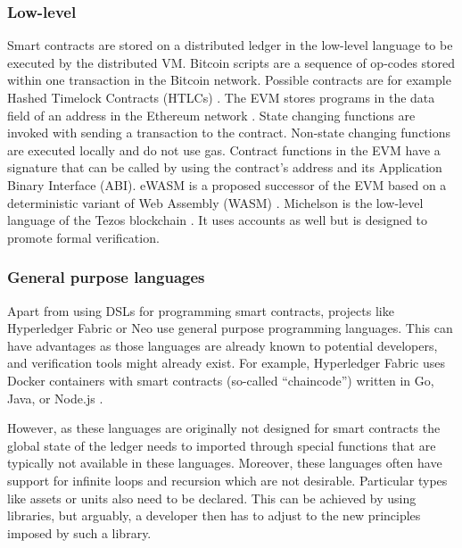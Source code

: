 \subsubsection{Low-level}
Smart contracts are stored on a distributed ledger in the low-level language to be executed by the distributed VM.
Bitcoin scripts are a sequence of op-codes stored within one transaction in the Bitcoin network\cite{BitcoinWiki2018Script}. 
Possible contracts are for example Hashed Timelock Contracts (HTLCs) \cite{BitcoinWiki2018HTLC}.
The EVM stores programs in the data field of an address in the Ethereum network \cite{Wood2014}. State changing functions are invoked with sending a transaction to the contract. Non-state changing functions are executed locally and do not use gas. Contract functions in the EVM have a signature that can be called by using the contract's address and its Application Binary Interface (ABI).
eWASM is a proposed successor of the EVM based on a deterministic variant of Web Assembly (WASM) \cite{Wanderer2015,EthereumFoundation2018ewasm}.
Michelson is the low-level language of the Tezos blockchain \cite{DynamicLedgerSolutions2017}. It uses accounts as well but is designed to promote formal verification.

\subsubsection{General purpose languages}
Apart from using DSLs for programming smart contracts, projects like Hyperledger Fabric or Neo use general purpose programming languages.
This can have advantages as those languages are already known to potential developers, and verification tools might already exist.
For example, Hyperledger Fabric uses Docker containers with smart contracts (so-called ``chaincode'') written in Go, Java, or Node.js \cite{Cachin2016}. 

However, as these languages are originally not designed for smart contracts the global state of the ledger needs to imported through special functions that are typically not available in these languages.
Moreover, these languages often have support for infinite loops and recursion which are not desirable.
Particular types like assets or units also need to be declared. 
This can be achieved by using libraries, but arguably, a developer then has to adjust to the new principles imposed by such a library.

